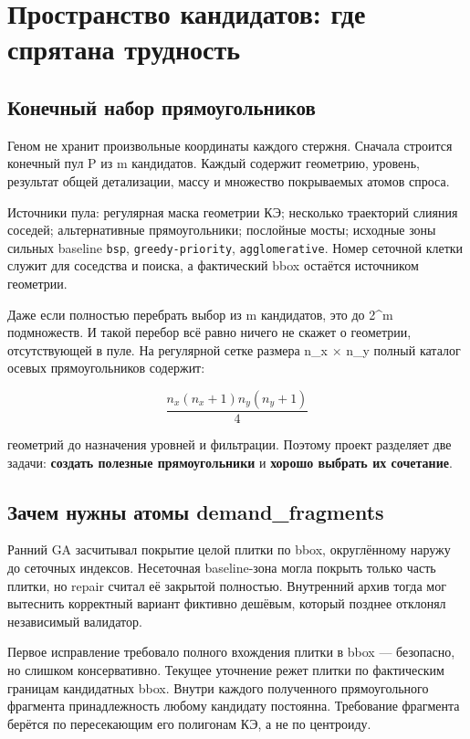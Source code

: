 \documentclass[11pt,a4paper]{article}
\begin{document}
\section{Пространство кандидатов: где спрятана трудность}

\subsection{Конечный набор прямоугольников}

Геном не хранит произвольные координаты каждого стержня. Сначала строится конечный пул P из m кандидатов. Каждый содержит геометрию, уровень, результат общей детализации, массу и множество покрываемых атомов спроса.


Источники пула: регулярная маска геометрии КЭ; несколько траекторий слияния соседей; альтернативные прямоугольники; послойные мосты; исходные зоны сильных baseline {\small\nolinkurl{bsp}}, {\small\nolinkurl{greedy-priority}}, {\small\nolinkurl{agglomerative}}. Номер сеточной клетки служит для соседства и поиска, а фактический bbox остаётся источником геометрии.


Даже если полностью перебрать выбор из m кандидатов, это до 2\textasciicircum{}m подмножеств. И такой перебор всё равно ничего не скажет о геометрии, отсутствующей в пуле. На регулярной сетке размера n\_x × n\_y полный каталог осевых прямоугольников содержит:


\[
\frac{n_x(n_x+1)n_y(n_y+1)}{4}
\]

геометрий до назначения уровней и фильтрации. Поэтому проект разделяет две задачи: \textbf{создать полезные прямоугольники} и \textbf{хорошо выбрать их сочетание}.


\subsection{Зачем нужны атомы demand\_fragments}

Ранний GA засчитывал покрытие целой плитки по bbox, округлённому наружу до сеточных индексов. Несеточная baseline-зона могла покрыть только часть плитки, но repair считал её закрытой полностью. Внутренний архив тогда мог вытеснить корректный вариант фиктивно дешёвым, который позднее отклонял независимый валидатор.


Первое исправление требовало полного вхождения плитки в bbox — безопасно, но слишком консервативно. Текущее уточнение режет плитки по фактическим границам кандидатных bbox. Внутри каждого полученного прямоугольного фрагмента принадлежность любому кандидату постоянна. Требование фрагмента берётся по пересекающим его полигонам КЭ, а не по центроиду.
\end{document}
